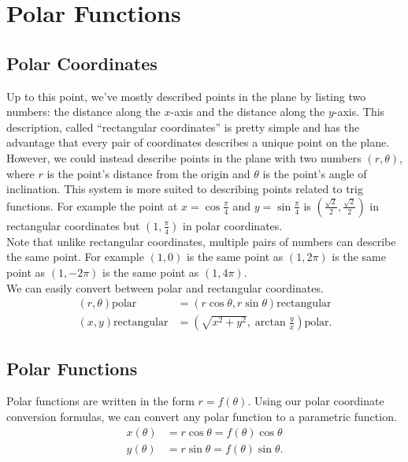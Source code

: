 \section{Polar Functions}
\subsection{Polar Coordinates}
Up to this point, we've mostly described points in the plane by listing two numbers: the distance along the $x$-axis and the distance along the $y$-axis.
This description, called ``rectangular coordinates'' is pretty simple and has the advantage that every pair of coordinates describes a unique point on the plane. \\

However, we could instead describe points in the plane with two numbers $(r,\theta)$, where $r$ is the point's distance from the origin and $\theta$ is the point's angle of inclination.
This system is more suited to describing points related to trig functions.
For example the point at $x=\cos{\frac{\pi}{4}}$ and $y=\sin{\frac{\pi}{4}}$ is $\left(\frac{\sqrt{2}}{2},\frac{\sqrt{2}}{2}\right)$ in rectangular coordinates but $\left(1,\frac{\pi}{4}\right)$ in polar coordinates. \\


Note that unlike rectangular coordinates, multiple pairs of numbers can describe the same point.
For example $\left(1,0\right)$ is the same point as $\left(1,2\pi\right)$ is the same point as $\left(1,-2\pi\right)$ is the same point as $\left(1,4\pi\right)$. \\


We can easily convert between polar and rectangular coordinates.
\begin{align*}
	\left(r,\theta\right) \text{polar} &= \left(r\cos{\theta}, r\sin{\theta}\right) \text{rectangular} \\
	\left(x,y\right) \text{rectangular} &= \left(\sqrt{x^2+y^2}, \arctan{\frac{y}{x}}\right) \text{polar}.
\end{align*}

\subsection{Polar Functions}
Polar functions are written in the form $r = f(\theta)$.
Using our polar coordinate conversion formulas, we can convert any polar function to a parametric function.
\begin{align*}
	x(\theta) &= r\cos{\theta} = f(\theta)\cos{\theta} \\
	y(\theta) &= r\sin{\theta} = f(\theta)\sin{\theta}.
\end{align*}

